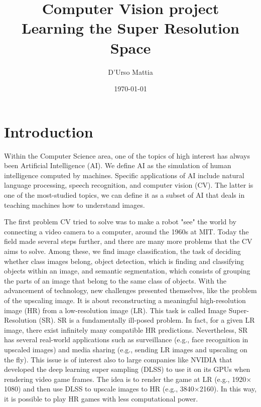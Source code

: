\documentclass{article}
\author{D'Urso Mattia}
\date{\today}
\title{\small Computer Vision project \\ \LARGE Learning the Super Resolution Space}
\begin{document}
\maketitle
\clearpage
\tableofcontents
\clearpage

\section{Introduction}
Within the Computer Science area, one of the topics of high interest has always been Artificial Intelligence (AI). We define AI as the simulation of human intelligence computed by machines. Specific applications of AI include natural language processing, speech recognition, and computer vision (CV). The latter is one of the most-studied topics, we can define it as a subset of AI that deals in teaching machines how to understand images.

The first problem CV tried to solve was to make a robot "see" the world by connecting a video camera to a computer, around the 1960s at MIT. Today the field made several steps further, and there are many more problems that the CV aims to solve. Among these, we find image classification, the task of deciding whether class images belong, object detection, which is finding and classifying objects within an image, and semantic segmentation, which consists of grouping the parts of an image that belong to the same class of objects. With the advancement of technology, new challenges presented themselves, like the problem of the upscaling image. It is about reconstructing a meaningful high-resolution image (HR) from a low-resolution image (LR). This task is called Image Super-Resolution (SR). SR is a fundamentally ill-posed problem. In fact, for a given LR image, there exist infinitely many compatible HR predictions. Nevertheless, SR has several real-world applications such as surveillance (e.g., face recognition in upscaled images) and media sharing (e.g., sending LR images and upscaling on the fly). This issue is of interest also to large companies like NVIDIA that developed the deep learning super sampling (DLSS) \cite{dlss} to use it on its GPUs when rendering video game frames. The idea is to render the game at LR (e.g., 1920$\times$1080) and then use DLSS to upscale images to HR (e.g., 3840$\times$2160). In this way, it is possible to play HR games with less computational power. 
\end{document}
